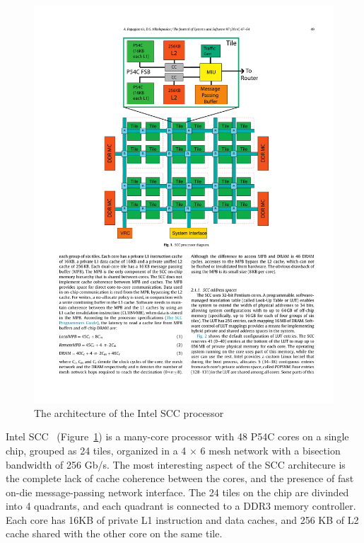 \begin{figure}
\begin{center}
\includegraphics{Figures/SCC.pdf}
\end{center}
\caption{The architecture of the Intel SCC processor}
\label{fig:scc}
\end{figure}

Intel SCC~\cite{Mattson2010} (Figure~\ref{fig:scc}) is a many-core processor
with 48 P54C cores on a single chip, grouped as 24 tiles, organized in a 4
$\times$ 6 mesh network with a bisection bandwidth of 256 Gb/s. The most
interesting aspect of the SCC architecure is the complete lack of cache
coherence between the cores, and the presence of fast on-die message-passing
network interface. The 24 tiles on the chip are divinded into 4 quadrants, and
each quadrant is connected to a DDR3 memory controller. Each core has 16KB of
private L1 instruction and data caches, and 256 KB of L2 cache shared with the
other core on the same tile.

